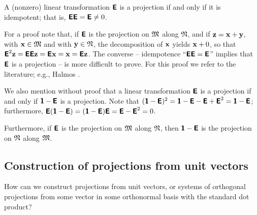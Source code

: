 A (nonzero) linear transformation
$\textsf{\textbf{E}}$ is a projection if and only if
it is idempotent; that is,
$\textsf{\textbf{E}}\textsf{\textbf{E}}=\textsf{\textbf{E}}\neq 0$.

{\color{OliveGreen}
\bproof
For a proof note that, if $\textsf{\textbf{E}}$  is the projection
on ${\frak M}$
along ${\frak N}$,
and if
$
{\bf z}
=
{\bf x}
+
{\bf y}
$, with
${\bf x} \in {\frak M}$
and with
${\bf y} \in {\frak N}$,
the decomposition of ${\bf x}$ yields
${\bf x}+0$, so that
$\textsf{\textbf{E}}^2{\bf z}=\textsf{\textbf{E}}\textsf{\textbf{E}}{\bf z}=\textsf{\textbf{E}}{\bf x}
={\bf x}=\textsf{\textbf{E}}{\bf z}$.
The converse --
idempotence
``$\textsf{\textbf{E}}\textsf{\textbf{E}}=\textsf{\textbf{E}}$''
implies that $\textsf{\textbf{E}}$ is a projection -- is more difficult to prove.
For this proof we refer to the literature; e.g., Halmos \cite{halmos-vs}.
\eproof
}

We also mention without proof that a linear transformation
$\textsf{\textbf{E}}$ is a projection if and only if
$\textsf{\textbf{1}}-\textsf{\textbf{E}}$ is a projection.
Note that $(\textsf{\textbf{1}}-\textsf{\textbf{E}})^2
=\textsf{\textbf{1}}-\textsf{\textbf{E}}-\textsf{\textbf{E}}+ \textsf{\textbf{E}}^2
=\textsf{\textbf{1}}-\textsf{\textbf{E}}$;
furthermore,
$
\textsf{\textbf{E}}(\textsf{\textbf{1}}-\textsf{\textbf{E}})=
(\textsf{\textbf{1}}-\textsf{\textbf{E}})\textsf{\textbf{E}}=
\textsf{\textbf{E}}- \textsf{\textbf{E}}^2=0
$.


Furthermore, if $\textsf{\textbf{E}}$  is the projection
on ${\frak M}$
along ${\frak N}$,
then
 $\textsf{\textbf{1}}-\textsf{\textbf{E}}$ is the projection
on ${\frak N}$
along ${\frak M}$.




\subsection{Construction of projections from unit vectors}

How can we construct projections from unit vectors, or systems of orthogonal projections from some vector in some orthonormal basis
with the standard dot product?

